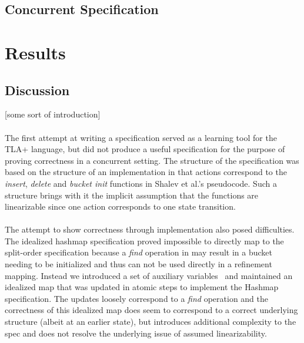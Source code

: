 \documentclass{uit-thesis}
\begin{document}
\section{Concurrent Specification}

\chapter{Results}\label{ch:results}
\section{Discussion}\label{sec:discussion}
[some sort of introduction]
\\\\
The first attempt at writing a specification served as a learning tool for the TLA+ language, but did not produce a useful specification for the purpose of proving correctness in a concurrent setting. The structure of the specification was based on the structure of an implementation in that actions correspond to the \textit{insert}, \textit{delete} and \textit{bucket init} functions in Shalev et al.'s pseudocode. Such a structure brings with it the implicit assumption that the functions are linearizable since one action corresponds to one state transition.
\\\\
The attempt to show correctness through implementation also posed difficulties. The idealized hashmap specification proved impossible to directly map to the split-order specification because a \textit{find} operation in may result in a bucket needing to be initialized and thus can not be used directly in a refinement mapping. Instead we introduced a set of auxiliary variables~\cite{Lamport2019a} and maintained an idealized map that was updated in atomic steps to implement the Hashmap specification. The updates loosely correspond to a \textit{find} operation and the correctness of this idealized map does seem to correspond to a correct underlying structure (albeit at an earlier state), but introduces additional complexity to the spec and does not resolve the underlying issue of assumed linearizability.
\end{document}
